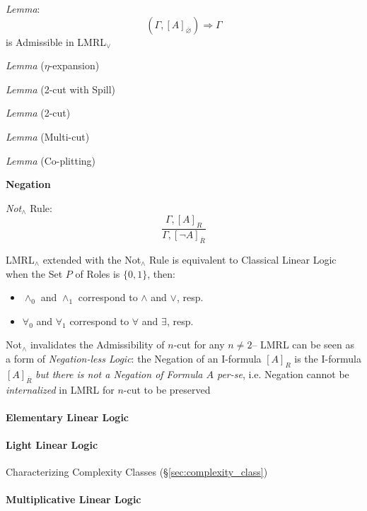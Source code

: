 \emph{Lemma}:
\[
  (\Gamma, [A]_{\overline{\varnothing}}) \Rightarrow \Gamma
\]
is Admissible in LMRL$_\vee$

\emph{Lemma} ($\eta$-expansion)

\emph{Lemma} (2-cut with Spill)

\emph{Lemma} (2-cut)

\emph{Lemma} (Multi-cut)

\emph{Lemma} (Co-plitting)



\textbf{Negation}

\emph{Not$_\wedge$} Rule:
\[
  \frac{
    \Gamma, [A]_R
  }{
    \Gamma, [\neg A]_{\overline{R}}
  }
\]

LMRL$_\wedge$ extended with the Not$_\wedge$ Rule is equivalent to
Classical Linear Logic when the Set $P$ of Roles is $\{0,1\}$, then:
\begin{itemize}
  \item $\wedge_0$ and $\wedge_1$ correspond to $\wedge$ and $\vee$,
    resp.
  \item $\forall_0$ and $\forall_1$ correspond to $\forall$ and
    $\exists$, resp.
\end{itemize}

Not$_\wedge$ invalidates the Admissibility of $n$-cut for any $n \neq
2$-- LMRL can be seen as a form of \emph{Negation-less Logic}: the
Negation of an I-formula $[A]_R$ is the I-formula $[A]_{\overline{R}}$
\emph{but there is not a Negation of Formula $A$ per-se}, i.e.
Negation cannot be \emph{internalized} in LMRL for $n$-cut to be
preserved


\endgroup



\paragraph{Elementary Linear Logic}\label{sec:elementary_linear_logic}\hfill

\paragraph{Light Linear Logic}\label{sec:light_linear_logic}\hfill

Characterizing Complexity Classes (\S\ref{sec:complexity_class})



\paragraph{Multiplicative Linear Logic}\hfill
\label{sec:multiplicative_linear_logic}


